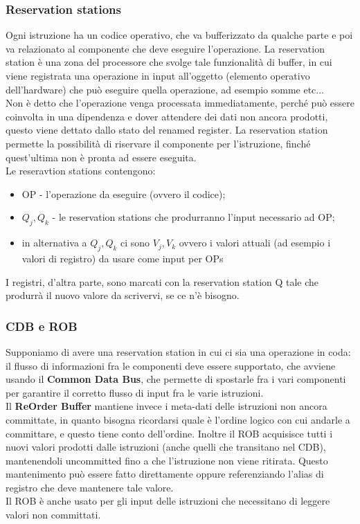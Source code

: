 \documentclass[12pt, oneside]{extbook}
\begin{document}
\subsubsection{Reservation stations}
Ogni istruzione ha un codice operativo, che va bufferizzato da qualche parte e poi va relazionato al componente che deve eseguire l'operazione. La reservation station è una zona del processore che svolge tale funzionalità di buffer, in cui viene registrata una operazione in input all'oggetto (elemento operativo dell'hardware) che può eseguire quella operazione, ad esempio somme etc...\\  Non è detto che l'operazione venga processata immediatamente, perché può essere coinvolta in una dipendenza e dover attendere dei dati non ancora prodotti, questo viene dettato dallo stato del renamed register. La reservation station permette la possibilità di riservare il componente per l'istruzione, finché quest'ultima non è pronta ad essere eseguita.\\ Le reseravtion stations contengono:
\begin{itemize}
\item OP - l'operazione da eseguire (ovvero il codice);
\item $Q_j, Q_k$ - le reservation stations che produrranno l'input necessario ad OP;
\item in alternativa a $Q_j, Q_k$ ci sono $V_j, V_k$ ovvero i valori attuali (ad esempio i valori di registro) da usare come input per OPs
\end{itemize}
I registri, d'altra parte, sono marcati con la reservation station Q tale che produrrà il nuovo valore da scrivervi, se ce n'è bisogno.
\subsubsection{CDB e ROB}
Supponiamo di avere una reservation station in cui ci sia una operazione in coda: il flusso di informazioni fra le componenti deve essere supportato, che avviene usando il \textbf{Common Data Bus}, che permette di spostarle fra i vari componenti per garantire il corretto flusso di input fra le varie istruzioni.\\ Il \textbf{ReOrder Buffer} mantiene invece i meta-dati delle istruzioni non ancora committate, in quanto bisogna ricordarsi quale è l'ordine logico con cui andarle a committare, e questo tiene conto dell'ordine. Inoltre il ROB acquisisce tutti i nuovi valori prodotti dalle istruzioni (anche quelli che transitano nel CDB), mantenendoli uncommitted fino a che l'istruzione non viene ritirata. Questo mantenimento può essere fatto direttamente oppure referenziando l'alias di registro che deve mantenere tale valore.\\ Il ROB è anche usato per gli input delle istruzioni che necessitano di leggere valori non committati.
\end{document}
